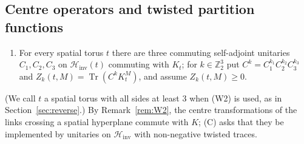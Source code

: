 \documentclass[11pt,a4paper]{article}
\theoremstyle{plain}
\theoremstyle{definition}
\theoremstyle{remark}
\numberwithin{equation}{section}
\newcommand{\Z}{\mathbb{Z}}
\newcommand{\Tr}{\operatorname{Tr}}
\newcommand{\Hinv}{\mathcal{H}_{\mathrm{inv}}}
\begin{document}
\subsection{Centre operators and twisted partition functions}\label{subsec:C}
\begin{enumerate}
\item[(C)] For every spatial torus $t$ there are three commuting self-adjoint unitaries $C_1,C_2,C_3$ on $\Hinv(t)$ commuting with $K_t$; for $k\in\Z_2^3$ put $C^k=C_1^{k_1}C_2^{k_2}C_3^{k_3}$ and $Z_k(t,M)=\Tr(C^kK_t^M)$, and assume $Z_k(t,M)\ge0$.
\end{enumerate}
(We call $t$ a spatial torus with all sides at least $3$ when (W2) is used, as in Section~\ref{sec:reverse}.) By Remark~\ref{rem:W2}, the centre transformations of the links crossing a spatial hyperplane commute with $K$; (C) asks that they be implemented by unitaries on $\Hinv$ with non-negative twisted traces.
\end{document}
